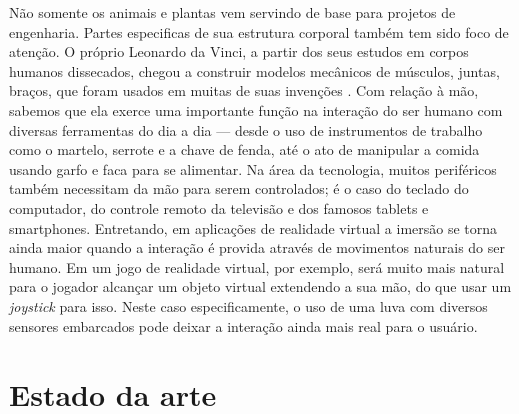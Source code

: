 \documentclass[
	12pt,				%
	openright,			%
	oneside,			%
	a4paper,			%
	english,			%
	brazil				%
	]{abntex2}
\begin{document}
		Não somente os animais e plantas vem servindo de base para projetos de engenharia. Partes especificas de sua estrutura corporal também tem sido foco de atenção. O próprio Leonardo da Vinci, a partir dos seus estudos em corpos humanos dissecados, chegou a construir modelos mecânicos de músculos, juntas, braços, que foram usados em muitas de suas invenções \cite{rosheim2006leonardo}. Com relação à mão, sabemos que ela exerce uma importante função na interação do ser humano com diversas ferramentas do dia a dia --- desde o uso de instrumentos de trabalho como o martelo, serrote e a chave de fenda, até o ato de manipular a comida usando garfo e faca para se alimentar. Na área da tecnologia, muitos periféricos também necessitam da mão para serem controlados; é o caso do teclado do computador, do controle remoto da televisão e dos famosos tablets e smartphones.	Entretando, em aplicações de realidade virtual a imersão se torna ainda maior quando a interação é provida através de movimentos naturais do ser humano. Em um jogo de realidade virtual, por exemplo, será muito mais natural para o jogador alcançar um objeto virtual extendendo a sua mão, do que usar um \textit{joystick} para isso. Neste caso especificamente, o uso de uma luva com diversos sensores embarcados pode deixar a interação ainda mais real para o usuário. 
	

		\section{Estado da arte}

\end{document}

